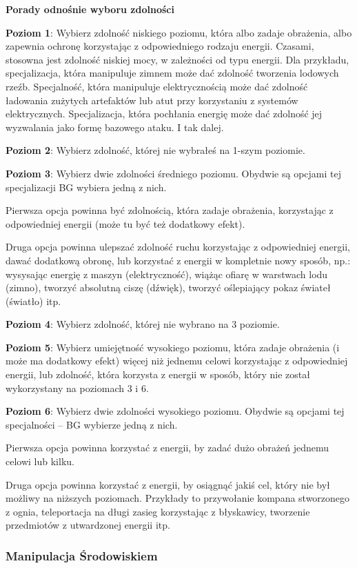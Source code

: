 \textbf{Porady odnośnie wyboru zdolności}

\textbf{Poziom 1}: Wybierz zdolność niskiego poziomu, która albo zadaje obrażenia, albo zapewnia ochronę korzystając z odpowiedniego rodzaju energii.
Czasami, stosowna jest zdolność niskiej mocy, w zależności od typu energii. Dla przykładu, specjalizacja, która manipuluje zimnem może dać zdolność tworzenia lodowych rzeźb. Specjalność, która manipuluje elektrycznością może dać zdolność ładowania zużytych artefaktów lub atut przy korzystaniu z systemów elektrycznych. Specjalizacja, która pochłania energię może dać zdolność jej wyzwalania jako formę bazowego ataku. I tak dalej.

\textbf{Poziom 2}: Wybierz zdolność, której nie wybrałeś na 1-szym poziomie.

\textbf{Poziom 3}: Wybierz dwie zdolności średniego poziomu. Obydwie są opcjami tej specjalizacji  BG wybiera jedną z nich.

Pierwsza opcja powinna być zdolnością, która zadaje obrażenia, korzystając z odpowiedniej energii (może tu być też dodatkowy efekt).

Druga opcja powinna ulepszać zdolność ruchu korzystając z odpowiedniej energii, dawać dodatkową obronę, lub korzystać z energii w kompletnie nowy sposób, np.: wysysając energię z maszyn (elektryczność), wiążąc ofiarę w warstwach lodu (zimno), tworzyć absolutną ciszę (dźwięk), tworzyć oślepiający pokaz świateł (światło) itp.

\textbf{Poziom 4}: Wybierz zdolność, której nie wybrano na 3 poziomie.

\textbf{Poziom 5}: Wybierz umiejętność wysokiego poziomu, która zadaje obrażenia (i może ma dodatkowy efekt) więcej niż jednemu celowi korzystając z odpowiedniej energii, lub zdolność, która korzysta z energii w sposób, który nie został wykorzystany na poziomach 3 i 6.

\textbf{Poziom 6}: Wybierz dwie zdolności wysokiego poziomu. Obydwie są opcjami tej specjalności – BG wybierze jedną z nich.

Pierwsza opcja powinna korzystać z energii, by zadać dużo obrażeń jednemu celowi lub kilku.

Druga opcja powinna korzystać z energii, by osiągnąć jakiś cel, który nie był możliwy na niższych poziomach. Przykłady to przywołanie kompana stworzonego z ognia, teleportacja na długi zasieg korzystając z błyskawicy, tworzenie przedmiotów z utwardzonej energii itp.

\subsubsection{Manipulacja Środowiskiem}

